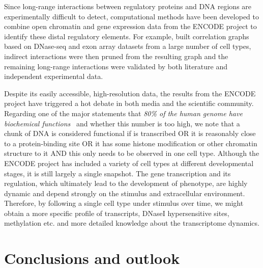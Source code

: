 Since long-range interactions between regulatory proteins
and DNA regions are experimentally difficult to detect,
computational methods have been developed to combine 
open chromatin and gene expression data from the ENCODE
project to identify these distal regulatory elements. 
For example, \cite{Demeyer2014} built correlation graphs 
based on DNase-seq and exon array datasets from a large 
number of cell types, indirect interactions were then pruned
from the resulting graph and the remaining long-range
interactions were validated by both literature and 
independent experimental data.

Despite its easily accessible, high-resolution data,
the results from the ENCODE project have triggered a hot
debate in both media and the scientific community.
Regarding one of the major statements that \emph{80\% of 
the human genome have biochemical functions}~%
\citep{ENCODE2012} and whether this number is too high, 
we note that a chunk of DNA is considered functional if is transcribed OR it is reasonably close to a protein-binding site OR it has some histone modification or other chromatin structure to it AND this only needs to be observed in one cell type. Although the ENCODE project has included
a variety of cell types at different developmental stages, 
it is still largely a single snapshot. The gene transcription
and its regulation, which ultimately lead to the development
of phenotype, are highly dynamic and depend strongly on the 
stimulus and extracellular environment. Therefore, 
by following a single cell type under stimulus over time,
we might
obtain a more specific profile of transcripts, DNaseI
hypersensitive sites, methylation etc. and more detailed
knowledge about the transcriptome dynamics.

\chapter{Conclusions and outlook}
